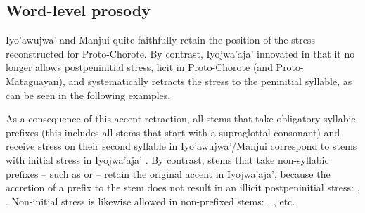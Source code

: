 \subsection{Word-level prosody}\label{ch-ijw-prosody}

Iyo'awujwa' and Manjui quite faithfully retain the position of the stress reconstructed for Proto-Chorote. By contrast, Iyojwa'aja' innovated in that it no longer allows postpeninitial stress, licit in Proto-Chorote (and Proto-Mataguayan), and systematically retracts the stress to the peninitial syllable, as can be seen in the following examples.

\begin{exe}
\ex {}
\ex {}
\ex {}
\ex {}
\ex {}
\ex {}
\ex {}
\end{exe}

As a consequence of this accent retraction, all stems that take obligatory syllabic prefixes (this includes all stems that start with a supraglottal consonant) and receive stress on their second syllable in Iyo’awujwa’/Manjui correspond to stems with initial stress in Iyojwa’aja’ \citep[91, fn. 22]{JC14b}. By contrast, stems that take non-syllabic prefixes -- such as  or  -- retain the original accent in Iyojwa’aja’, because the accretion of a prefix to the stem does not result in an illicit postpeninitial stress: , . Non-initial stress is likewise allowed in non-prefixed stems: , , etc.
\fussy
